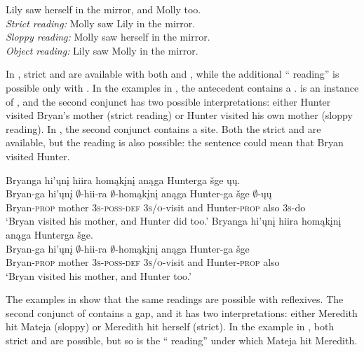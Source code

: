 \documentclass[output=paper]{LSP/langsci}
\begin{document}
{{\ea\label{ex:johnson:43} 
Lily saw herself in the mirror, and Molly too.\\
\textit{Strict reading:} Molly saw Lily in the mirror.\\
\textit{Sloppy reading:} Molly saw herself in the mirror.\\
\textit{Object reading:} Lily saw Molly in the mirror.
\z

In , strict and  are available with both  and , while the additional `` reading'' is possible only with . In the examples in , the antecedent  contains a  .  is an instance of , and the second conjunct has two possible interpretations: either Hunter visited Bryan's mother (strict reading) or Hunter visited his own mother (sloppy reading). In , the second conjunct contains a   site. Both the strict and  are available, but the  reading is also possible: the sentence could mean that Bryan visited Hunter.
 
\ea\label{ex:johnson:44}
\ea\label{ex:johnson:44a} 
\glll Bryanga hi'ųnį hiira homąkįnį anąga Hunterga šge ųų.\\
Bryan-ga hi'ųnį $\emptyset$-hii-ra $\emptyset$-homąkįnį anąga Hunter-ga šge $\emptyset$-ųų\\
Bryan-\textsc{prop} mother \textsc{3s-poss-def} \textsc{3s/o}-visit and Hunter-\textsc{prop} also \textsc{3s}-do\\
\trans `Bryan visited his mother, and Hunter did too.'
\ex\label{ex:johnson:44b}
\glll Bryanga hi'ųnį hiira homąkįnį anąga Hunterga šge.\\
Bryan-ga hi'ųnį $\emptyset$-hii-ra $\emptyset$-homąkįnį anąga Hunter-ga šge\\
Bryan-\textsc{prop} mother \textsc{3s-poss-def} \textsc{3s/o}-visit and Hunter-\textsc{prop} also\\
\trans `Bryan visited his mother, and Hunter too.'
\z
\z

The examples in  show that the same readings are possible with reflexives. The second conjunct of  contains a  gap, and it has two interpretations: either Meredith hit Mateja (sloppy) or Meredith hit herself (strict). In the  example in , both strict and  are possible, but so is the `` reading'' under which Mateja hit Meredith.
 
}}
\end{document}
